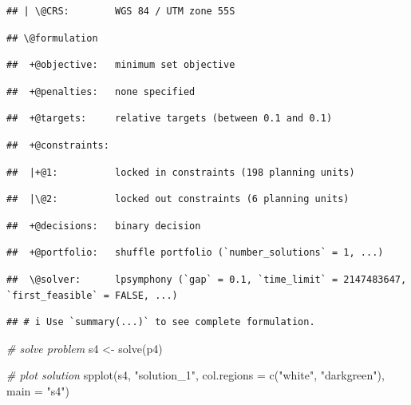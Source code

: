 \documentclass[
  12pt,
]{book}
\newenvironment{Shaded}{\begin{snugshade}}{\end{snugshade}}
\newcommand{\AttributeTok}[1]{\textcolor[rgb]{0.77,0.63,0.00}{#1}}
\newcommand{\CommentTok}[1]{\textcolor[rgb]{0.56,0.35,0.01}{\textit{#1}}}
\newcommand{\FunctionTok}[1]{\textcolor[rgb]{0.00,0.00,0.00}{#1}}
\newcommand{\NormalTok}[1]{#1}
\newcommand{\OtherTok}[1]{\textcolor[rgb]{0.56,0.35,0.01}{#1}}
\newcommand{\StringTok}[1]{\textcolor[rgb]{0.31,0.60,0.02}{#1}}
\begin{document}
\begin{verbatim}
## | \@CRS:        WGS 84 / UTM zone 55S
\end{verbatim}

\begin{verbatim}
## \@formulation
\end{verbatim}

\begin{verbatim}
##  +@objective:   minimum set objective
\end{verbatim}

\begin{verbatim}
##  +@penalties:   none specified
\end{verbatim}

\begin{verbatim}
##  +@targets:     relative targets (between 0.1 and 0.1)
\end{verbatim}

\begin{verbatim}
##  +@constraints:
\end{verbatim}

\begin{verbatim}
##  |+@1:          locked in constraints (198 planning units)
\end{verbatim}

\begin{verbatim}
##  |\@2:          locked out constraints (6 planning units)
\end{verbatim}

\begin{verbatim}
##  +@decisions:   binary decision
\end{verbatim}

\begin{verbatim}
##  +@portfolio:   shuffle portfolio (`number_solutions` = 1, ...)
\end{verbatim}

\begin{verbatim}
##  \@solver:      lpsymphony (`gap` = 0.1, `time_limit` = 2147483647, `first_feasible` = FALSE, ...)
\end{verbatim}

\begin{verbatim}
## # i Use `summary(...)` to see complete formulation.
\end{verbatim}

\begin{Shaded}
\begin{Highlighting}[]
\CommentTok{\# solve problem}
\NormalTok{s4 }\OtherTok{\textless{}{-}} \FunctionTok{solve}\NormalTok{(p4)}

\CommentTok{\# plot solution}
\FunctionTok{spplot}\NormalTok{(s4, }\StringTok{"solution\_1"}\NormalTok{, }\AttributeTok{col.regions =} \FunctionTok{c}\NormalTok{(}\StringTok{"white"}\NormalTok{, }\StringTok{"darkgreen"}\NormalTok{), }\AttributeTok{main =} \StringTok{"s4"}\NormalTok{)}
\end{Highlighting}
\end{Shaded}
\end{document}
